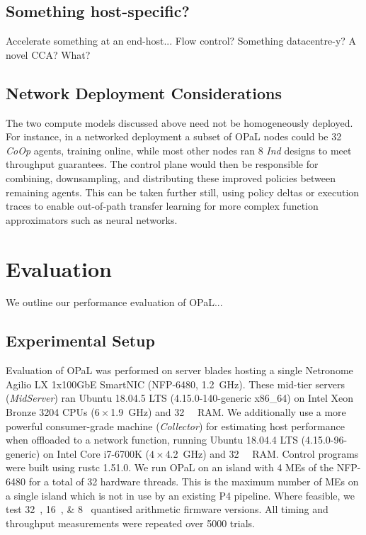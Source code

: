 \documentclass[sigconf,natbib=false]{acmart}
\newcommand{\approachshort}{OPaL}
\newcommand{\Coopfw}{\emph{CoOp}}
\newcommand{\coopfw}{\Coopfw}
\newcommand{\Indfw}{\emph{Ind}}
\newcommand{\indfw}{\Indfw}
\begin{document}
\subsection{Something host-specific?}\label{sec:integ-2}
Accelerate something at an end-host... Flow control? Something datacentre-y? A novel CCA? What?

\subsection{Network Deployment Considerations}
The two compute models discussed above need not be homogeneously deployed.
For instance, in a networked deployment a subset of \approachshort{} nodes could be \SI{32}{\bit} \emph{\coopfw{}} agents, training online, while most other nodes ran \SI{8}{\bit} \emph{\indfw{}} designs to meet throughput guarantees.
The control plane would then be responsible for combining, downsampling, and distributing these improved policies between remaining agents.
This can be taken further still, using policy deltas or execution traces to enable out-of-path transfer learning for more complex function approximators such as neural networks.

\section{Evaluation}\label{sec:evaluation}
We outline our performance evaluation of \approachshort...

\subsection{Experimental Setup}\label{sec:experimental-setup}
Evaluation of \approachshort{} was performed on server blades hosting a single Netronome Agilio LX 1x100GbE SmartNIC (NFP-6480, \SI{1.2}{\giga\hertz}).
These mid-tier servers (\emph{MidServer}) ran Ubuntu 18.04.5 LTS (4.15.0-140-generic x86\_64) on Intel Xeon Bronze 3204 CPUs ($6\times$\SI{1.9}{\giga\hertz}) and \SI{32}{\gibi\byte} RAM.
We additionally use a more powerful consumer-grade machine (\emph{Collector}) for estimating host performance when offloaded to a network function, running Ubuntu 18.04.4 LTS (4.15.0-96-generic) on Intel Core i7-6700K ($4\times$\SI{4.2}{\giga\hertz}) and \SI{32}{\gibi\byte} RAM.
Control programs were built using rustc 1.51.0.
We run \approachshort{} on an island with \num{4} MEs of the NFP-6480 for a total of \num{32} hardware threads.
This is the maximum number of MEs on a single island which is not in use by an existing P4 pipeline.
Where feasible, we test \SIlist{32;16;8}{\bit} quantised arithmetic firmware versions.
All timing and throughput measurements were repeated over \num{5000} trials.
\end{document}
